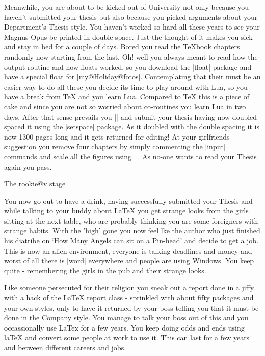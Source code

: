 Meanwhile, you are about to be kicked out of University not only because you haven't submitted your thesis but also because you picked arguments about your Department's Thesis style. You haven't worked so hard all these years to see your Magnus Opus be printed in double space. Just the thought of it makes you sick and stay in bed for a couple of days. Bored you read the TeXbook chapters randomly now starting from the last. Oh! well you always meant to read how the output routine and how floats worked, so you download the |float| package and have a special float for |my@Holiday@fotos|. Contemplating  that their must be an easier way to do all these you decide its time to play around with Lua, so you have a break from TeX and you learn Lua. Compared to TeX this is a piece of cake and since you are not so worried about co-routines you learn Lua in two days. After that sense prevails you |\obey@thelines| and submit your thesis having now doubled spaced it using the |setspace| package. As it doubled with the double spacing it is now 1300 pages long  and it gets returned for editing! At your girlfriends suggestion you remove four chapters by simply commenting the |input| commands and  scale all the figures using |\scalebox|. As no-one wants to read your Thesis again you pass.

The rookie@v stage

You now go out to have a drink, having successfully submitted your Thesis and while talking to your buddy about LaTeX you get strange looks from the girls sitting at the next table, who are probably thinking you are some foreigners with strange habits. With the 'high' gone you now feel lke the author who just finished his diatribe on `How Many Angels can sit on a Pin-head' and decide to get a job. This is now an alien environment, everyone is talking deadlines and money and worst of all there is |word| everywhere and people are using Windows. You keep quite - remembering the girls in the pub and their strange looks. 

Like someone persecuted for their religion you sneak out a report done in a jiffy with a hack of the LaTeX report class - sprinkled with about fifty packages and your own styles, only to have it returned by your boss telling you that it must be done in the Company style. You manage to talk your boss out of this and you occassionally use LaTex for a few years. You keep doing odds and ends using laTeX and convert some people at work to use it. This can last for a few years and between different careers and jobs.

